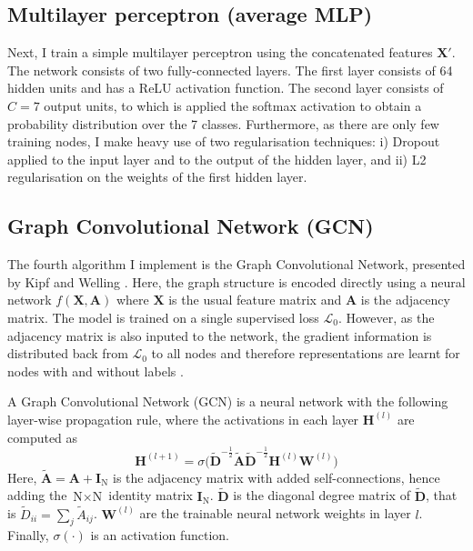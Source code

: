 \documentclass[12pt]{article}
\theoremstyle{definition}
\begin{document}
\subsection{Multilayer perceptron (average MLP)}
Next, I train a simple multilayer perceptron using the concatenated features $\mathbf{X}'$. The network consists of two fully-connected layers. The first layer consists of 64 hidden units and has a ReLU activation function. The second layer consists of $C=7$ output units, to which is applied the softmax activation to obtain a probability distribution over the 7 classes. Furthermore, as there are only few training nodes, I make heavy use of two regularisation techniques: i) Dropout \cite{srivastava2014dropout} applied to the input layer and to the output of the hidden layer, and ii) L2 regularisation on the weights of the first hidden layer.

\subsection{Graph Convolutional Network (GCN)}
The fourth algorithm I implement is the Graph Convolutional Network, presented by Kipf and Welling \cite{kipf2017semi}. Here, the graph structure is encoded directly using a neural network $f(\mathbf{X}, \mathbf{A})$ where $\mathbf{X}$ is the usual feature matrix and $\mathbf{A}$ is the adjacency matrix. The model is trained on a single supervised loss $\mathcal{L}_0$. However, as the adjacency matrix is also inputed to the network, the gradient information is distributed back from $\mathcal{L}_0$ to all nodes and therefore representations are learnt for nodes with and without labels \cite{kipf2017semi}.

\bigskip

A Graph Convolutional Network (GCN) is a neural network with the following layer-wise propagation rule, where the activations in each layer $\mathbf{H}^{(l)}$ are computed as
\[
\mathbf{H}^{(l+1)} = \sigma \big( \tilde{\mathbf{D}}^{-\frac{1}{2}} \tilde{\mathbf{A}} \tilde{\mathbf{D}}^{-\frac{1}{2}} \mathbf{H}^{(l)} \mathbf{W}^{(l)}\big)
\]
Here, $\tilde{\mathbf{A}} = \mathbf{A} + \mathbf{I}_\textrm{N}$ is the adjacency matrix with added self-connections, hence adding the $\textrm{N} \times \textrm{N}$ identity matrix $\mathbf{I}_\textrm{N}$. $\tilde{\mathbf{D}}$ is the diagonal degree matrix of $\tilde{\mathbf{D}}$, that is $\tilde{D}_{ii} = \sum_{j} \tilde{A}_{ij}$. $\mathbf{W}^{(l)}$ are the trainable neural network weights in layer $l$. Finally, $\sigma(\cdot)$ is an activation function.
\end{document}
